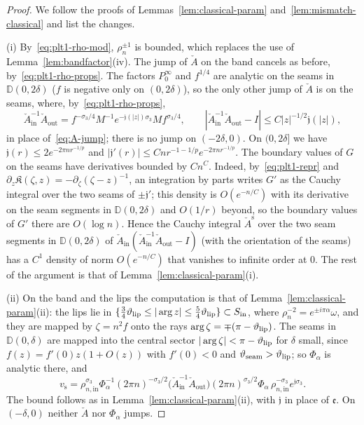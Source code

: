 \begin{proof}
We follow the proofs of Lemmas~\ref{lem:classical-param} and~\ref{lem:mismatch-classical} and list the changes.

(i) By~\eqref{eq:plt1-rho-mod}, $\rho_n^{\pm1}$ is bounded, which replaces the use of Lemma~\ref{lem:bandfactor}(iv). The
jump of $\check A$ on the band cancels as before, by~\eqref{eq:plt1-rho-props}. The factors $P^\infty_0$ and $f^{1/4}$
are analytic on the seams in $\mathbb D(0,2\delta)$ ($f$ is negative only on $(0,2\delta)$), so the only other jump of
$\check A$ is on the seams, where, by~\eqref{eq:plt1-rho-props},
\[
  \check A_{\mathrm{in}}^{-1}\check A_{\mathrm{out}}=f^{-\sigma_3/4}M^{-1}e^{-\mathfrak j(|z|)\sigma_3}Mf^{\sigma_3/4},\qquad
  |\check A_{\mathrm{in}}^{-1}\check A_{\mathrm{out}}-I|\le C|z|^{-1/2}\mathfrak j(|z|),
\]
in place of~\eqref{eq:A-jump}; there is no jump on $(-2\delta,0)$. On $(0,2\delta]$ we have
$\mathfrak j(r)\le2e^{-2\pi nr^{-1/p}}$ and $|\mathfrak j'(r)|\le Cnr^{-1-1/p}e^{-2\pi nr^{-1/p}}$. The boundary values of
$G$ on the seams have derivatives bounded by $Cn^C$. Indeed, by~\eqref{eq:plt1-repr} and
$\partial_z\mathfrak K(\zeta,z)=-\partial_\zeta(\zeta-z)^{-1}$, an integration by parts writes $G'$ as the Cauchy integral
over the two seams of $\pm\mathfrak j'$; this density is $O(e^{-n/C})$ with its derivative on the seam segments in
$\mathbb D(0,2\delta)$ and $O(1/r)$ beyond, so the boundary values of $G'$ there are $O(\log n)$. Hence the Cauchy integral
$\check A^{\mathrm s}$ over the two seam segments in $\mathbb D(0,2\delta)$ of
$\check A_{\mathrm{in}}(\check A_{\mathrm{in}}^{-1}\check A_{\mathrm{out}}-I)$ (with the orientation of the seams) has a $C^1$
density of norm $O(e^{-n/C})$ that vanishes to infinite order at $0$. The rest of the argument is that of
Lemma~\ref{lem:classical-param}(i).

(ii) On the band and the lips the computation is that of Lemma~\ref{lem:classical-param}(ii): the lips lie in
$\{\frac34\vartheta_{\mathrm{lip}}\le|\arg z|\le\frac54\vartheta_{\mathrm{lip}}\}\subset S_{\mathrm{in}}$, where $\rho_n^{-2}=e^{\pm i\pi\alpha}\omega$, and they are
mapped by $\zeta=n^2f$ onto the rays $\arg\zeta=\mp(\pi-\vartheta_{\mathrm{lip}})$. The seams in $\mathbb D(0,\delta)$ are mapped into the
central sector $|\arg\zeta|<\pi-\vartheta_{\mathrm{lip}}$ for $\delta$ small, since $f(z)=f'(0)z(1+O(z))$ with $f'(0)<0$ and
$\vartheta_{\mathrm{seam}}>\vartheta_{\mathrm{lip}}$; so $\Phi_\alpha$ is analytic there, and
\[
  v_{\mathrm s}=\rho_{n,\mathrm{in}}^{\sigma_3}\Phi_\alpha^{-1}(2\pi n)^{-\sigma_3/2}\bigl(\check A_{\mathrm{in}}^{-1}\check A_{\mathrm{out}}\bigr)
  (2\pi n)^{\sigma_3/2}\Phi_\alpha\,\rho_{n,\mathrm{in}}^{-\sigma_3}e^{\mathfrak j\sigma_3}.
\]
The bound follows as in Lemma~\ref{lem:classical-param}(ii), with $\mathfrak j$ in place of $\mathfrak e$. On $(-\delta,0)$
neither $\check A$ nor $\Phi_\alpha$ jumps.


\end{proof}
